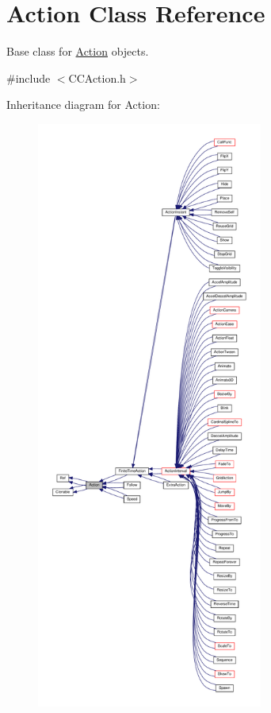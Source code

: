 \hypertarget{classAction}{}\section{Action Class Reference}
\label{classAction}


Base class for \hyperlink{classAction}{Action} objects.  




{\ttfamily \#include $<$C\+C\+Action.\+h$>$}



Inheritance diagram for Action\+:
\nopagebreak
\begin{figure}[H]
\begin{center}
\leavevmode
\includegraphics[height=550pt]{classAction__inherit__graph}
\end{center}
\end{figure}


